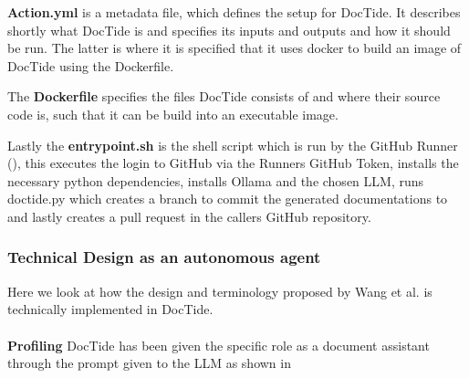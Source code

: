\textbf{Action.yml} is a metadata file, which defines the setup for DocTide. It describes shortly what DocTide is and specifies its inputs and outputs and how it should be run. The latter is where it is specified that it uses docker to build an image of DocTide using the Dockerfile. 

The \textbf{Dockerfile} specifies the files DocTide consists of and where their source code is, such that it can be build into an executable image. 

Lastly the \textbf{entrypoint.sh} is the shell script which is run by the GitHub Runner (), this executes the login to GitHub via the Runners GitHub Token, installs the necessary python dependencies, installs Ollama and the chosen LLM, runs doctide.py which creates a branch to commit the generated documentations to and lastly creates a pull request in the callers GitHub repository.

\subsubsection{Technical Design as an autonomous agent}
Here we look at how the design and terminology proposed by Wang et al. \cite{wang2024survey} is technically implemented in DocTide. 
\\ \\
\textbf{Profiling}
DocTide has been given the specific role as a document assistant through the prompt given to the LLM as shown in 

